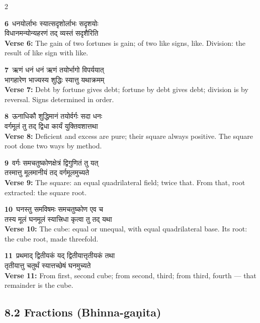 \documentclass[11pt,a4paper]{article}
\newcommand{\dev}[1]{{\devanagarifont #1}}
\newcommand{\vnum}[1]{\textcolor{versenumbercolor}{\textbf{#1}}}
\begin{document}
\begin{paracol}{2}

\switchcolumn[0]
\vnum{6}\ \dev{धनयोर्लाभः स्यात्सदृशोर्लाभः सदृशयोः}\\
\dev{विधानमन्योन्यहरणं तद् व्यस्तं सदृशैरिति}\\
\switchcolumn[1]
\textbf{Verse 6:} The gain of two fortunes is gain; of two like signs, like. Division: the result of like sign with like.

\switchcolumn[0]
\vnum{7}\ \dev{ऋणं धनं धनं ऋणं तयोर्भागो विपर्ययात्}\\
\dev{भागहारेण भाज्यस्य शुद्धिः स्यात्तु यथाक्रमम्}\\
\switchcolumn[1]
\textbf{Verse 7:} Debt by fortune gives debt; fortune by debt gives debt; division is by reversal. Signs determined in order.

\switchcolumn[0]
\vnum{8}\ \dev{ऊनाधिकौ शुद्धिमानं तयोर्वर्गः सदा धनः}\\
\dev{वर्गमूलं तु तद् द्विधा कार्यं युक्तिवशात्तथा}\\
\switchcolumn[1]
\textbf{Verse 8:} Deficient and excess are pure; their square always positive. The square root done two ways by method.

\switchcolumn[0]
\vnum{9}\ \dev{वर्गः समचतुष्कोणक्षेत्रं द्विगुणितं तु यत्}\\
\dev{तस्मात्तु मूलमानीयं तद् वर्गमूलमुच्यते}\\
\switchcolumn[1]
\textbf{Verse 9:} The square: an equal quadrilateral field; twice that. From that, root extracted: the square root.

\switchcolumn[0]
\vnum{10}\ \dev{घनस्तु समविषमः समचतुष्कोण एव च}\\
\dev{तस्य मूलं घनमूलं स्यात्त्रिधा कृत्वा तु तद् यथा}\\
\switchcolumn[1]
\textbf{Verse 10:} The cube: equal or unequal, with equal quadrilateral base. Its root: the cube root, made threefold.

\switchcolumn[0]
\vnum{11}\ \dev{प्रथमाद् द्वितीयकं यद् द्वितीयात्तृतीयकं तथा}\\
\dev{तृतीयात्तु चतुर्थं स्यात्तच्छेषं घनमुच्यते}\\
\switchcolumn[1]
\textbf{Verse 11:} From first, second cube; from second, third; from third, fourth --- that remainder is the cube.

\end{paracol}

\subsection*{8.2 Fractions (Bhinna-ga\d nita)}
\label{sec:8.2}
\end{document}
